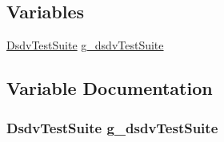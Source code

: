 \subsection*{Variables}
\begin{DoxyCompactItemize}
\item 
\hyperlink{classDsdvTestSuite}{Dsdv\+Test\+Suite} \hyperlink{dsdv-testcase_8cc_a08d255ac54d04390028ef8033d6e0cf2}{g\+\_\+dsdv\+Test\+Suite}
\end{DoxyCompactItemize}


\subsection{Variable Documentation}
\subsubsection[{\texorpdfstring{g\+\_\+dsdv\+Test\+Suite}{g_dsdvTestSuite}}]{\setlength{\rightskip}{0pt plus 5cm} {\bf Dsdv\+Test\+Suite}  g\+\_\+dsdv\+Test\+Suite}\hypertarget{dsdv-testcase_8cc_a08d255ac54d04390028ef8033d6e0cf2}{}\label{dsdv-testcase_8cc_a08d255ac54d04390028ef8033d6e0cf2}
